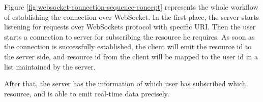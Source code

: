 
Figure \ref{fig:websocket-connection-sequence-concept} represents the whole workflow of establishing the connection over WebSocket. In the first place, the server starts listening for requests over WebSockets protocol with specific URI. Then the user starts a connection to server for subscribing the resource he requires. As soon as the connection is successfully established, the client will emit the resource id to the server side, and resource id from the client will be mapped to the user id in a list maintained by the server.

After that, the server has the information of which user has subscribed which resource, and is able to emit real-time data precisely.
